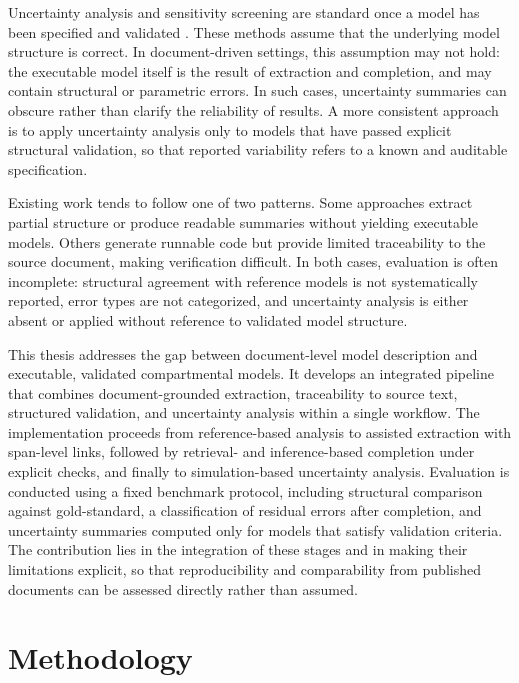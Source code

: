 \documentclass[a4paper,12pt]{article}
\begin{document}
Uncertainty analysis and sensitivity screening are standard once a model has been specified and validated \citep{morris1991factorial}. These methods assume that the underlying model structure is correct. In document-driven settings, this assumption may not hold: the executable model itself is the result of extraction and completion, and may contain structural or parametric errors. In such cases, uncertainty summaries can obscure rather than clarify the reliability of results. A more consistent approach is to apply uncertainty analysis only to models that have passed explicit structural validation, so that reported variability refers to a known and auditable specification.

Existing work tends to follow one of two patterns. Some approaches extract partial structure or produce readable summaries without yielding executable models. Others generate runnable code but provide limited traceability to the source document, making verification difficult. In both cases, evaluation is often incomplete: structural agreement with reference models is not systematically reported, error types are not categorized, and uncertainty analysis is either absent or applied without reference to validated model structure.

This thesis addresses the gap between document-level model description and executable, validated compartmental models. It develops an integrated pipeline that combines document-grounded extraction, traceability to source text, structured validation, and uncertainty analysis within a single workflow. The implementation proceeds from reference-based analysis to assisted extraction with span-level links, followed by retrieval- and inference-based completion under explicit checks, and finally to simulation-based uncertainty analysis. Evaluation is conducted using a fixed benchmark protocol, including structural comparison against gold-standard, a classification of residual errors after completion, and uncertainty summaries computed only for models that satisfy validation criteria. The contribution lies in the integration of these stages and in making their limitations explicit, so that reproducibility and comparability from published documents can be assessed directly rather than assumed.

\section{Methodology}
\end{document}
